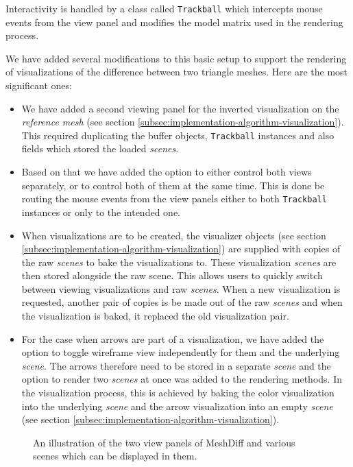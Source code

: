 Interactivity is handled by a class called \verb+Trackball+ which intercepts mouse events from the view panel and modifies the model matrix used in the rendering process.

We have added several modifications to this basic setup to support the rendering of visualizations of the difference between two triangle meshes. Here are the most significant ones:

\begin{itemize}
\item We have added a second viewing panel for the inverted visualization on the {\it reference mesh} (see section \ref{subsec:implementation-algorithm-visualization}). This required duplicating the buffer objects, \verb+Trackball+ instances and also fields which stored the loaded {\it scenes}.
\item Based on that we have added the option to either control both views separately, or to control both of them at the same time. This is done be routing the mouse events from the view panels either to both \verb+Trackball+ instances or only to the intended one.
\item When visualizations are to be created, the visualizer objects (see section \ref{subsec:implementation-algorithm-visualization}) are supplied with copies of the raw {\it scenes} to bake the visualizations to. These visualization {\it scenes} are then stored alongside the raw scene. This allows users to quickly switch between viewing visualizations and raw {\it scenes}. When a new visualization is requested, another pair of copies is be made out of the raw {\it scenes} and when the visualization is baked, it replaced the old visualization pair.
\item For the case when arrows are part of a visualization, we have added the option to toggle wireframe view independently for them and the underlying {\it scene}. The arrows therefore need to be stored in a separate {\it scene} and the option to render two {\it scenes} at once was added to the rendering methods. In the visualization process, this is achieved by baking the color visualization into the underlying {\it scene} and the arrow visualization into an empty {\it scene} (see section \ref{subsec:implementation-algorithm-visualization}).
\end{itemize}

\begin{figure}[h]
	\centering
	\def\svgwidth{\textwidth}
	
	\caption[Scenes Explained]{An illustration of the two view panels of MeshDiff and various scenes which can be displayed in them.}
	\label{fig:illustration-scenes_explained}
\end{figure}

